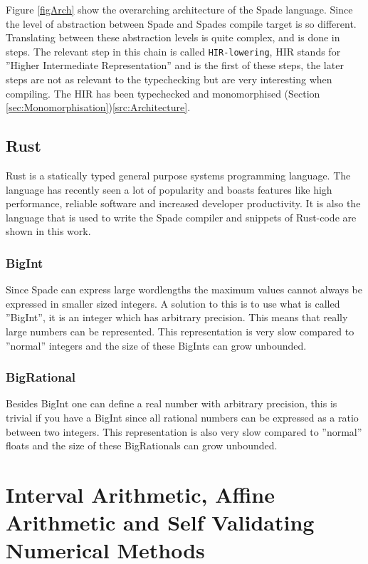 Figure \ref{figArch} show the overarching architecture of the Spade language. Since the level of abstraction between Spade and Spades compile target is so different. Translating between these abstraction levels is quite complex, and is done in steps. The relevant step in this chain is called \verb+HIR-lowering+, HIR stands for ''Higher Intermediate Representation'' and is the first of these steps, the later steps are not as relevant to the typechecking but are very interesting when compiling. The HIR has been typechecked and monomorphised (Section \ref{sec:Monomorphisation})\ref{src:Architecture}.

\subsection{Rust}
Rust is a statically typed general purpose systems programming language. The language has recently seen a lot of popularity and boasts features like high performance, reliable software and increased developer productivity. It is also the language that is used to write the Spade compiler and snippets of Rust-code are shown in this work. \cite{src:Rust}

\subsubsection{BigInt}
Since Spade can express large wordlengths the maximum values cannot always be expressed in smaller sized integers. A solution to this is to use what is called ''BigInt'', it is an integer which has arbitrary precision. This means that really large numbers can be represented. This representation is very slow compared to ''normal'' integers and the size of these BigInts can grow unbounded.

\subsubsection{BigRational}
Besides BigInt one can define a real number with arbitrary precision, this is trivial if you have a BigInt since all rational numbers can be expressed as a ratio between two integers. This representation is also very slow compared to ''normal'' floats and the size of these BigRationals can grow unbounded. 


\section{Interval Arithmetic, Affine Arithmetic and Self Validating Numerical Methods}
\label{sec:IAndAA}

